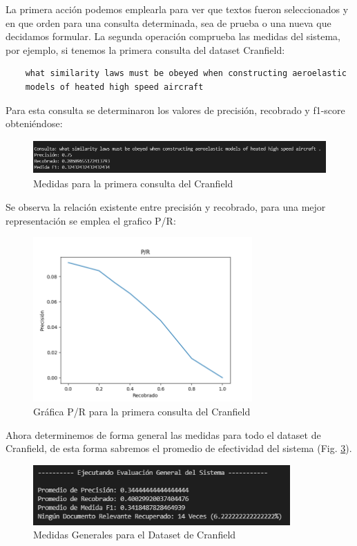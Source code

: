 \documentclass[runningheads,a4paper]{llncs}
\begin{document}
La primera acción podemos emplearla para ver que textos fueron seleccionados y en que orden para una consulta determinada, sea de prueba o una nueva que decidamos formular. La segunda operación comprueba las medidas del sistema, por ejemplo, si tenemos la primera consulta del dataset Cranfield: \\

\begin{verbatim}
	what similarity laws must be obeyed when constructing aeroelastic 
	models of heated high speed aircraft
\end{verbatim}

Para esta consulta se determinaron los valores de precisión, recobrado y f1-score obteniéndose:

\begin{figure}
	\centering
	\includegraphics[height=1.3cm]{imgs/eval_query1_cran.png}
	\caption{Medidas para la primera consulta del Cranfield}
	\label{fig:cran1}
\end{figure}

Se observa la relación existente entre precisión y recobrado, para una mejor representación se emplea el grafico P/R:

\begin{figure}
	\centering
	\includegraphics[height=6.3cm]{imgs/pr_query1_cran.png}
	\caption{Gráfica P/R para la primera consulta del Cranfield}
	\label{fig:cran1img}
\end{figure}

Ahora determinemos de forma general las medidas para todo el dataset de Cranfield, de esta forma sabremos el promedio de efectividad del sistema (Fig. \ref{fig:cran1gen}).

\begin{figure}
	\centering
	\includegraphics[height=2.3cm]{imgs/eval_general_cran.png}
	\caption{Medidas Generales para el Dataset de Cranfield}
	\label{fig:cran1gen}
\end{figure}
\end{document}
